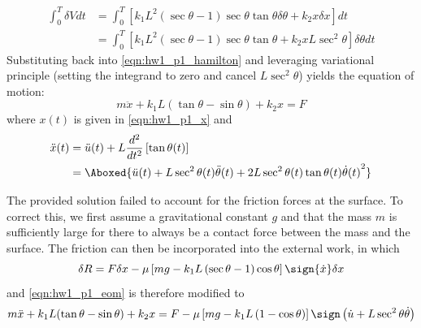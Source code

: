 \begin{enumerate}[(i)]
{\begin{subequations}
\begin{equation}
\begin{aligned}
        \int_0^T \delta V dt &= \int_0^T \left[ k_1 L^2  \left( \sec\theta - 1\right) \sec\theta \tan\theta \delta \theta + k_2 x \delta x \right] dt \\
        &= \int_0^T \left[ k_1 L^2  \left( \sec\theta - 1\right) \sec\theta \tan\theta + k_2 x L \sec^2\theta \right] \delta\theta dt
    \end{aligned}
    \end{equation}
    \end{subequations}
    Substituting back into \cref{eqn:hw1_p1_hamilton} and leveraging variational principle (setting the integrand to zero and cancel $L\sec^2\theta$) yields the equation of motion:
    \begin{equation}\label{eqn:hw1_p1_eom}
        \boxed{m\ddot{x} + k_1 L (\tan\theta - \sin\theta) + k_2 x = F}
    \end{equation}
    where $x(t)$ is given in \cref{eqn:hw1_p1_x} and 
    \begin{equation}
    \begin{aligned}
        \ddot{x}(t) &= \ddot{u}(t) + L\frac{d^2}{dt^2} \left[ \tan\theta(t) \right] \\
        &= \Aboxed{\ddot{u}(t) + L \sec^2\theta(t) \ddot{\theta}(t) + 2L \sec^2\theta(t) \tan\theta(t) {\dot{\theta}(t)}^2}
    \end{aligned}
    \end{equation}

    \begin{errata}
    The provided solution failed to account for the friction forces at the surface. 
    To correct this, we first assume a gravitational constant $g$ and that the mass $m$ is sufficiently large for there to always be a contact force between the mass and the surface.
    The friction can then be incorporated into the external work, in which 
    \begin{equation}
        \delta R = F \delta x - \mu \left[m g - k_1 L \left( \sec\theta - 1\right) \cos\theta\right] \sign{\dot{x}} \delta x
    \end{equation}
    and \cref{eqn:hw1_p1_eom} is therefore modified to 
    \begin{equation}
        m\ddot{x} + k_1 L (\tan\theta - \sin\theta) + k_2 x = F - \mu \left[m g - k_1 L \left( 1 - \cos\theta \right) \right] \sign\left(\dot{u} + L \sec^2\theta \dot{\theta} \right)
    \end{equation}
    \end{errata}
}
\end{enumerate}


